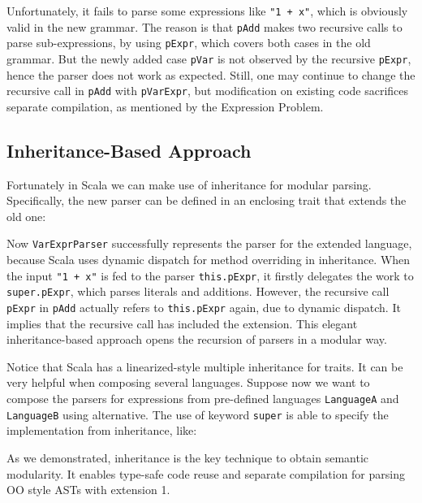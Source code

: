 
Unfortunately, it fails to parse some expressions like \lstinline{"1 + x"}, which is obviously valid in the new grammar.
The reason is that \lstinline{pAdd} makes two recursive calls to parse sub-expressions, by using \lstinline{pExpr}, which
covers both cases in the old grammar. But the newly added case \lstinline{pVar} is not observed by the recursive \lstinline{pExpr},
hence the parser does not work as expected. Still, one may continue to change the recursive call in \lstinline{pAdd} with \lstinline{pVarExpr},
but modification on existing code sacrifices separate compilation, as mentioned by the Expression Problem.

\subsection{Inheritance-Based Approach}\label{subsec:inheritance-approach}

Fortunately in Scala we can make use of inheritance for modular parsing. Specifically,
the new parser can be defined in an enclosing trait that extends
the old one:

Now \lstinline{VarExprParser} successfully represents the parser for the extended language, because Scala uses dynamic dispatch for
method overriding in inheritance. When the input \lstinline{"1 + x"} is fed to the parser \lstinline{this.pExpr}, it firstly delegates
the work to \lstinline{super.pExpr}, which parses literals and additions. However, the recursive call \lstinline{pExpr} in \lstinline{pAdd}
actually refers to \lstinline{this.pExpr} again, due to dynamic dispatch. It implies that the recursive call has included the extension. This
elegant inheritance-based approach opens the recursion of parsers in a modular way.

Notice that Scala has a linearized-style multiple inheritance for traits. It can be very helpful when composing several languages. Suppose now
we want to compose the parsers for expressions from pre-defined languages \lstinline{LanguageA} and \lstinline{LanguageB} using alternative.
The use of keyword \lstinline{super} is able to
specify the implementation from inheritance, like:


As we demonstrated, inheritance is the key technique to obtain semantic modularity.
It enables type-safe code reuse and separate compilation for parsing OO style ASTs with extension 1.


